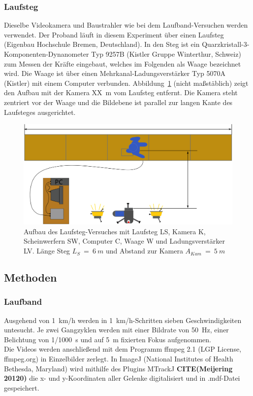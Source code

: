 \subsubsection{Laufsteg}
Dieselbe Videokamera und Baustrahler wie bei dem Laufband-Versuchen werden verwendet. Der Proband läuft in diesem Experiment über einen Laufsteg (Eigenbau Hochschule Bremen, Deutschland). In den Steg ist ein Quarzkristall-3-Komponenten-Dynanometer Typ 9257B (Kistler Gruppe Winterthur, Schweiz) zum Messen der Kräfte eingebaut, welches im Folgenden als Waage bezeichnet wird. Die Waage ist über einen Mehrkanal-Ladungsverstärker Typ 5070A (Kistler) mit einem Computer verbunden. Abbildung~\ref{fig:laufstg_stp} (nicht maßstäblich) zeigt den Aufbau mit der Kamera XX~m vom Laufsteg entfernt. Die Kamera steht zentriert vor der Waage und die Bildebene ist parallel zur langen Kante des Laufsteges ausgerichtet.

\begin{figure}[h!]
	\centering
	\includegraphics[width=0.7\linewidth]{bilder/mat_met/Laufsteg_setup}
	\caption[Aufbau Laufsteg Versuch]{Aufbau des Laufsteg-Versuches mit Laufsteg LS, Kamera K, Scheinwerfern SW, Computer C, Waage W und Ladungsverstärker LV. Länge Steg $L_S~=~6~m$ und Abstand zur Kamera $A_{Kam}~=~5~m$}
	\label{fig:laufstg_stp}
\end{figure}

\subsection{Methoden}
\subsubsection{Laufband}
Ausgehend von 1~km/h werden in 1~km/h-Schritten sieben Geschwindigkeiten untesucht. Je zwei Gangzyklen werden mit einer Bildrate von 50~Hz, einer Belichtung von 1/1000~s und auf 5~m fixierten Fokus aufgenommen.\\
Die Videos werden anschließend mit dem Programm ffmpeg 2.1 (LGP License, ffmpeg.org) in Einzelbilder zerlegt. In ImageJ (National Institutes of Health Bethesda, Maryland) wird mithilfe des Plugins MTrackJ \textbf{CITE(Meijering 20120)} die x- und y-Koordinaten aller Gelenke digitalisiert und in .mdf-Datei gespeichert.

